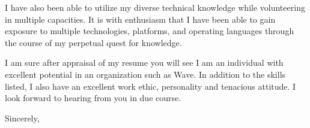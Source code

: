 \documentclass[11pt]{letter} %
\begin{document}
\begin{letter}{}
I have also been able to utilize my diverse technical knowledge while
volunteering in multiple capacities. It is with enthusiasm that I have been
able to gain exposure to multiple technologies, platforms, and operating
languages through the course of my perpetual quest for knowledge.

I am sure after appraisal of my resume you will see I am an individual with
excellent potential in an organization such as {Wave}. In addition to
the skills listed, I also have an excellent work ethic, personality and
tenacious attitude. I look forward to hearing from you in due course.

\closing{Sincerely,}



\end{letter}
\end{document}
